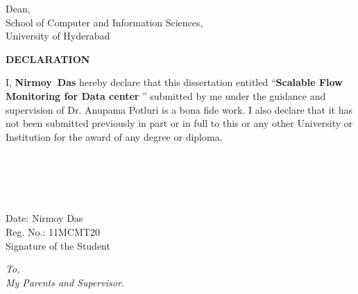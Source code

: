 \documentclass[a4,12pt,oneside]{book}
\renewenvironment{frontmatter}{\pagenumbering{roman}}{\newpage
  \pagenumbering{arabic}}
\newenvironment{dedication}{
  \thispagestyle{empty}
  \clearpage\null\vfill
  \sl \hspace{1in}To,\\
  
  \hspace{1.5in}}{
  \vspace{3in}\vfill\null}
\def\prefacesection#1{%
  \chapter*{#1}
  \addcontentsline{toc}{chapter}{#1}
  \markboth{#1}{#1}}
\newenvironment{abstract}{\null\vfil\prefacesection{Abstract}}{\par\vfill\null}
\newenvironment{acknowledgments}{\null\vfil\prefacesection{Acknowledgments}}{\par\vfill\null}
\begin{document}
\begin{frontmatter}
{	\vspace{1.0in}
	{\flushright Dean,\\
	School of Computer and Information Sciences,\\
	University of Hyderabad\\}
	}

\newpage
	{%
	\thispagestyle{empty}
	\begin{center} 
		\textbf{\large DECLARATION}  
	\end{center}\vspace{.75in}

	{\sloppy I, \textbf{\mbox{Nirmoy Das}} hereby declare that this dissertation entitled ``\textbf{Scalable Flow Monitoring for Data center}
	'' submitted by me under the guidance and supervision of Dr. Anupama Potluri is a bona fide work. 
	I also declare that it has not been submitted previously in part or in full to this or any other University or Institution for the award of any degree or diploma. }\\ \\ \\ \\ \\ \\

	{\flushleft Date:   } 
	{\flushright Nirmoy Das\\
	Reg. No.: 11MCMT20\\
	\vspace{0.5in}
	Signature of the Student\\
	}
	}

    	\begin{dedication}
    	\thispagestyle{empty}
      		My Parents and Supervisor.
    	\end{dedication}
    
    
    
    	\tableofcontents
    	\listoffigures
    	\listoftables
\end{frontmatter}
  
%
\end{document}
